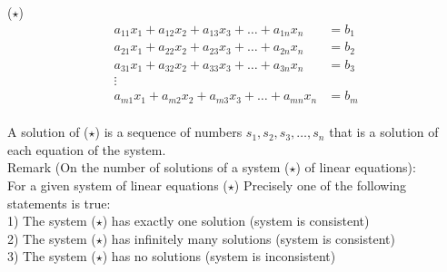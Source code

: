 \documentclass{jhwhw}
\begin{document}
(\(\star\)) \begin{align*} 
a_{11} x_1 + a_{12} x_2 + a_{13} x_3 + \ldots + a_{1n} x_n &= b_1\\
a_{21} x_1 + a_{22} x_2 + a_{23} x_3 + \ldots + a_{2n} x_n &= b_2\\
a_{31} x_1 + a_{32} x_2 + a_{33} x_3 + \ldots + a_{3n} x_n &= b_3\\
\vdots \\
a_{m1} x_1 + a_{m2} x_2 + a_{m3} x_3 + \ldots + a_{mn} x_n &= b_m
\end{align*}
\\

A solution of (\(\star\)) is a sequence of numbers \(s_1, s_2, s_3, \ldots, s_n\) that is a solution of each equation of the system.
\\

Remark (On the number of solutions of a system (\(\star\)) of linear equations):
\\

For a given system of linear equations (\(\star\)) Precisely one of the following statements is true:
\\

1) The system (\(\star\)) has exactly one solution (system is consistent) \\
2) The system (\(\star\)) has infinitely many solutions (system is consistent) \\
3) The system (\(\star\)) has no solutions (system is inconsistent) \\
\end{document}
